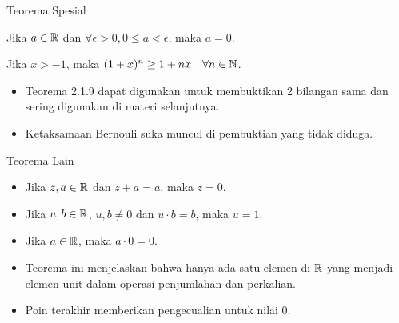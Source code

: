 \documentclass{beamer}
\begin{document}
\begin{frame}{Teorema Spesial}
    \begin{tcolorbox}[enhanced,title=Teorema 2.1.9, frame style tile={width=\paperwidth}{\wallpaper}]
        Jika $a \in \mathbb{R}$ dan $\forall \epsilon > 0, 0 \leq a < \epsilon$, maka $a=0$.
    \end{tcolorbox}
    \begin{tcolorbox}[enhanced,title=Ketaksamaan Bernouli, frame style tile={width=\paperwidth}{\wallpaper}]
        Jika $x > -1$, maka $(1+x)^n \geq 1 +nx \quad \forall n \in \mathbb{N}$.
    \end{tcolorbox}
    \begin{itemize}
        \item Teorema 2.1.9 dapat digunakan untuk membuktikan 2 bilangan sama dan sering digunakan 
        di materi selanjutnya.
        \item Ketaksamaan Bernouli suka muncul di pembuktian yang tidak diduga.
    \end{itemize}
\end{frame}

\begin{frame}{Teorema Lain}
    \begin{tcolorbox}[enhanced,title=Teorema 2.1.2 (Terkait Unit), frame style tile={width=\paperwidth}{\wallpaper}]
        \begin{itemize}
            \item Jika $z,a \in \mathbb{R}$ dan $z+a=a$, maka $z=0$.
            \item Jika $u,b \in \mathbb{R}$, $u,b \neq 0$ dan $u \cdot b = b$, maka $u = 1$.
            \item Jika $a \in \mathbb{R}$, maka $a \cdot 0 = 0$.
        \end{itemize}
    \end{tcolorbox}
    \begin{itemize}
        \item Teorema ini menjelaskan bahwa hanya ada satu elemen di $\mathbb{R}$ yang
        menjadi elemen unit dalam operasi penjumlahan dan perkalian.
        \item Poin terakhir memberikan pengecualian untuk nilai $0$.
    \end{itemize}
\end{frame}
\end{document}
